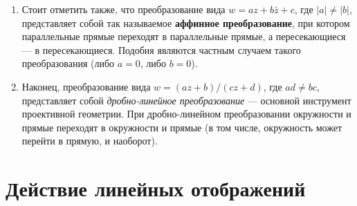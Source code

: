 \begin{enumerate}
\item Стоит отметить также, что преобразование вида $w=az+b\bar z+c$, где $|a|\ne|b|$, представляет собой так называемое \textbf{аффинное преобразование}, при котором параллельные прямые переходят в параллельные прямые, а пересекающиеся --- в пересекающиеся. Подобия являются частным случаем такого преобразования (либо $a=0$, либо $b=0$).

\item Наконец, преобразование вида $w=(az+b)/(cz+d)$, где $ad\ne bc$, представляет собой \textit{дробно-линейное преобразование} --- основной инструмент проективной геометрии. При дробно-линейном преобразовании окружности и прямые переходят в окружности и прямые (в том числе, окружность может перейти в прямую, и наоборот).

\end{enumerate}





\section{Действие линейных отображений}


